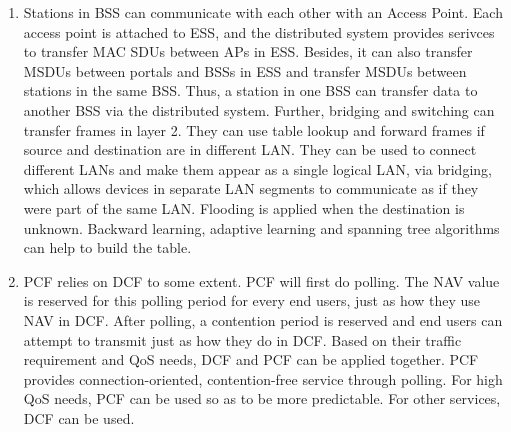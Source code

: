 \documentclass{article}
\begin{document}
\begin{enumerate}
    \item
    Stations in BSS can communicate with each other with an Access Point. Each access point is attached to ESS, and the distributed system provides serivces to transfer MAC SDUs between APs in ESS. Besides, it can also transfer MSDUs between portals and BSSs in ESS and transfer MSDUs between stations in the same BSS. Thus, a station in one BSS can transfer data to another BSS via the distributed system.
    \newline
    Further, bridging and switching can transfer frames in layer 2. They can use table lookup and forward frames if source and destination are in different LAN. They can be used to connect different LANs and make them appear as a single logical LAN, via bridging, which allows devices in separate LAN segments to communicate as if they were part of the same LAN. Flooding is applied when the destination is unknown. Backward learning, adaptive learning and spanning tree algorithms can help to build the table. 
    
    \item
    PCF relies on DCF to some extent. PCF will first do polling. The NAV value is reserved for this polling period for every end users, just as how they use NAV in DCF. After polling, a contention period is reserved and end users can attempt to transmit just as how they do in DCF. 
    Based on their traffic requirement and QoS needs, DCF and PCF can be applied together. PCF provides connection-oriented, contention-free service through polling. For high QoS needs, PCF can be used so as to be more predictable. For other services, DCF can be used.
    
    
    
\end{enumerate}
\end{document}
